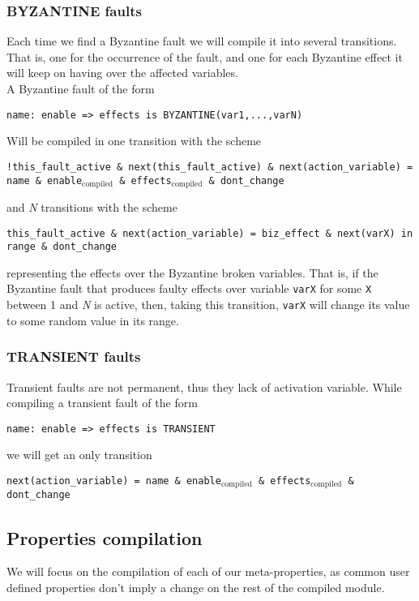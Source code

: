 \documentclass[12pt]{article}
\newcommand{\textusc}[1]{$_{\text{#1}}$} %
\begin{document}
\subsubsection*{BYZANTINE faults}
Each time we find a Byzantine fault we will compile it into several transitions. That is, one for the occurrence of the fault, and one for each Byzantine effect it will keep on having over the affected variables.\\
A Byzantine fault of the form
\begin{center}
\texttt{name: enable => effects is BYZANTINE(var1,...,varN)}
\end{center}
Will be compiled in one transition with the scheme
\begin{center}
\texttt{!this\_fault\_active \& next(this\_fault\_active) \& next(action\_variable) = name \& enable\textusc{compiled} \& effects\textusc{compiled} \& dont\_change}
\end{center}
and \textit{N} transitions with the scheme
\begin{center}
\texttt{this\_fault\_active \& next(action\_variable) = biz\_effect \& next(varX) in range \& dont\_change}
\end{center}
representing the effects over the Byzantine broken variables. That is, if the Byzantine fault that produces faulty effects over variable \texttt{varX} for some \texttt{X} between 1 and \textit{N} is active, then, taking this transition, \texttt{varX} will change its value to some random value in its range.

\subsubsection*{TRANSIENT faults}
Transient faults are not permanent, thus they lack of activation variable. While compiling a transient fault of the form
\begin{center}
\texttt{name: enable => effects is TRANSIENT}
\end{center}
we will get an only transition
\begin{center}
\texttt{next(action\_variable) = name \& enable\textusc{compiled} \& effects\textusc{compiled} \& dont\_change}
\end{center}


\subsection{Properties compilation}
We will focus on the compilation of each of our meta-properties, as common user defined properties don't imply a change on the rest of the compiled module.
\end{document}
